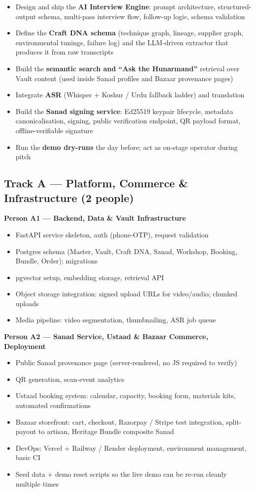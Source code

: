 \documentclass[11pt, a4paper]{article}
\begin{document}
\begin{itemize}
  \item Design and ship the {\bfseries AI Interview Engine}: prompt architecture, structured-output schema, multi-pass interview flow, follow-up logic, schema validation
  \item Define the {\bfseries Craft DNA schema} (technique graph, lineage, supplier graph, environmental tunings, failure log) and the LLM-driven extractor that produces it from raw transcripts
  \item Build the {\bfseries semantic search and ``Ask the Hunarmand''} retrieval over Vault content (used inside Sanad profiles and Bazaar provenance pages)
  \item Integrate {\bfseries ASR} (Whisper + Koshur / Urdu fallback ladder) and translation
  \item Build the {\bfseries Sanad signing service}: Ed25519 keypair lifecycle, metadata canonicalisation, signing, public verification endpoint, QR payload format, offline-verifiable signature
  \item Run the {\bfseries demo dry-runs} the day before; act as on-stage operator during pitch
\end{itemize}

\subsection{Track A --- Platform, Commerce \& Infrastructure (2 people)}

\textbf{Person A1 --- Backend, Data \& Vault Infrastructure}
\begin{itemize}
  \item FastAPI service skeleton, auth (phone-OTP), request validation
  \item Postgres schema (Master, Vault, Craft DNA, Sanad, Workshop, Booking, Bundle, Order); migrations
  \item pgvector setup, embedding storage, retrieval API
  \item Object storage integration: signed upload URLs for video/audio; chunked uploads
  \item Media pipeline: video segmentation, thumbnailing, ASR job queue
\end{itemize}

\textbf{Person A2 --- Sanad Service, Ustaad \& Bazaar Commerce, Deployment}
\begin{itemize}
  \item Public Sanad provenance page (server-rendered, no JS required to verify)
  \item QR generation, scan-event analytics
  \item Ustaad booking system: calendar, capacity, booking form, materials kits, automated confirmations
  \item Bazaar storefront: cart, checkout, Razorpay / Stripe test integration, split-payout to artisan, Heritage Bundle composite Sanad
  \item DevOps: Vercel + Railway / Render deployment, environment management, basic CI
  \item Seed data + demo reset scripts so the live demo can be re-run cleanly multiple times
\end{itemize}
\end{document}
